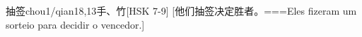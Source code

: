 \begin{EntryWithPhonetic}{抽签}{chou1/qian1}{8,13}{⼿、⽵}[HSK 7-9]
  [他们抽签决定胜者。===Eles fizeram um sorteio para decidir o vencedor.]
\end{EntryWithPhonetic}

